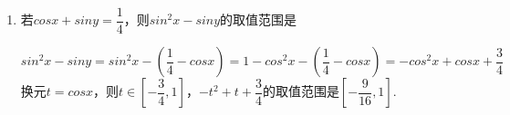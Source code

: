 \begin{enumerate}
\begin{jieda}
\begin{enumerate}
            故$sin\alpha - cos\alpha = \pm \dfrac{7}{5}$
            \\
            根据$\alpha \in \left(0, \pi\right)$，故$sin \alpha - cos\alpha > -1$，因此$sin\alpha - cos\alpha = \dfrac{7}{5}$ \\
            \ps 可以根据$sin\alpha + cos\alpha$在不同象限的值域直接判断出来$\alpha$是第二象限角.
            \item $sin^3 \alpha + cos^3 \alpha = \left(sin\alpha + cos\alpha\right)\left(sin^2 \alpha + cos^2 \alpha - sin\alpha cos\alpha\right) = \left(\dfrac{1}{5}\right)\left(1 + \dfrac{12}{25}\right) = \dfrac{37}{125}$ \\
            \ps 也可以在第一问的结果上构建方程组$\left \{ \begin{array}{l}
                sin\alpha + cos\alpha = \frac{1}{5} \\
                sin\alpha - cos\alpha = \frac{7}{5} 
            \end{array}\right.$解得$\left \{ \begin{array}{l}
                sin\alpha = \frac{4}{5} \\
                cos\alpha = -\frac{3}{5} 
            \end{array}\right.$后带入计算(下同)
            \item $\sin ^4 \alpha+\cos ^4 \alpha = \left(\sin ^2 \alpha+\cos ^2 \alpha\right)^2 - 2\left(sin \alpha cos\alpha\right)^2 = 1 - 2 \times \left(-\dfrac{12}{25}\right)^2 = \dfrac{337}{625}$
        \end{enumerate}
    \end{jieda}
    
    \item 若$cosx + siny = \dfrac{1}{4}$，则$sin^2x - siny$的取值范围是
    \begin{jieda}
        $sin^2x - siny = sin^2x - \left(\dfrac{1}{4} - cosx\right) = 1 - cos^2x - \left(\dfrac{1}{4} - cosx\right) = -cos^2x + cosx + \dfrac{3}{4}$ \\
        换元$t = cosx$，则$t \in \left[-\dfrac{3}{4}, 1\right]$，$-t^2 + t + \dfrac{3}{4}$的取值范围是$\left[-\dfrac{9}{16}, 1 \right]$.
    \end{jieda}
    

\end{enumerate}

